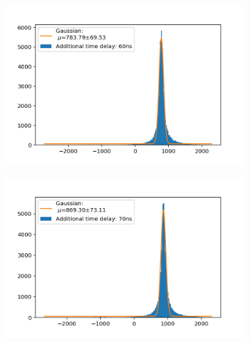 \documentclass[]{article}
\begin{document}
\begin{figure}[H]
\medskip
\begin{subfigure}{0.48\textwidth}
\includegraphics[width=\linewidth]{Plots/Time/60ns.png}
\end{subfigure}
\begin{subfigure}[c]{0.48\linewidth}
\includegraphics[width=\linewidth]{Plots/Time/70ns.png}
\end{subfigure}


\end{figure}
\end{document}

